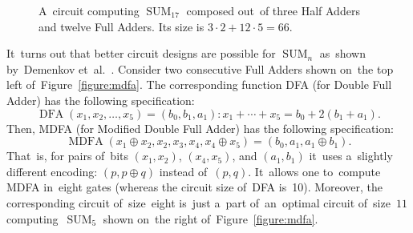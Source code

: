 \documentclass[sigconf, review, anonymous]{acmart}
\DeclareMathOperator{\SUM}{SUM}
\DeclareMathOperator{\MDFA}{MDFA}
\begin{document}
\begin{figure}
    \begin{center}
    \end{center}
    \caption{A~circuit computing $\SUM_{17}$ composed out~of three Half Adders and twelve Full Adders. Its size is $3 \cdot 2 + 12 \cdot 5=66$.}
    \label{figure:sum17fa}
\end{figure}

It~turns out that better circuit designs are possible for $\SUM_n$
as~shown by~Demenkov et~al.~\cite{DBLP:journals/ipl/DemenkovKKY10}.
Consider two consecutive Full Adders shown on~the top left of~Figure~\ref{figure:mdfa}. The corresponding function DFA (for Double Full Adder) has the following specification: \[\operatorname{DFA}(x_1, x_2,\dotsc,x_5)=(b_0,b_1,a_1) \colon x_1+\dotsb+x_5=b_0+2(b_1+a_1).\]
Then, MDFA (for Modified Double Full Adder) has the following specification:
\[\MDFA(x_1 \oplus x_2, x_2, x_3, x_4, x_4 \oplus x_5)=(b_0, a_1, a_1 \oplus b_1).\]
That~is, for pairs of~bits $(x_1, x_2)$, $(x_4, x_5)$, and $(a_1, b_1)$
it~uses a~slightly different encoding: $(p, p \oplus q)$ instead of~$(p,q)$.
It~allows one to~compute MDFA in~eight gates (whereas the circuit size of~DFA is~10). Moreover, the corresponding circuit of~size~eight is~just a~part
of~an~optimal circuit of~size~$11$ computing~$\SUM_5$ shown on~the right
of~Figure~\ref{figure:mdfa}.
\end{document}
